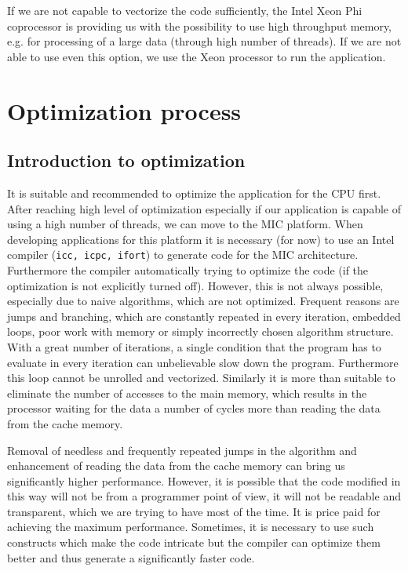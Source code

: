 \par If we are not capable to vectorize the code sufficiently, the Intel Xeon Phi coprocessor is providing us with the possibility to use high throughput memory, e.g. for processing of a large data (through high number of threads). If we are not able to use even this option, we use the Xeon processor to run the application. 

\section{Optimization process}

\subsection{Introduction to optimization}
It is suitable and recommended to optimize the application for the CPU first. After reaching high level of optimization especially if our application is capable of using a high number of threads, we can move to the MIC platform. When developing applications for this platform it is necessary (for now) to use an Intel compiler (\texttt{icc, icpc, ifort}) to generate code for the MIC architecture. Furthermore the compiler automatically trying to optimize the code (if the optimization is not explicitly turned off). However, this is not always possible, especially due to naive algorithms, which are not optimized. Frequent reasons are jumps and branching, which are constantly repeated in every iteration, embedded loops, poor work with memory or simply incorrectly chosen algorithm structure. With a great number of iterations, a single condition that the program has to evaluate in every iteration can unbelievable slow down the program. Furthermore this loop cannot be unrolled and vectorized. Similarly it is more than suitable to eliminate the number of accesses to the main memory, which results in the processor waiting for the data a number of cycles more than reading the data from the cache memory.

\par Removal of needless and frequently repeated jumps in the algorithm and enhancement of reading the data from the cache memory can bring us significantly higher performance. However, it is possible that the code modified in this way will not be  from a programmer point of view, it will not be readable and transparent, which we are trying to have most of the time. It is price paid for achieving the maximum performance. Sometimes, it is necessary to use such constructs which make the code intricate but the compiler can optimize them better and thus generate a significantly faster code.

